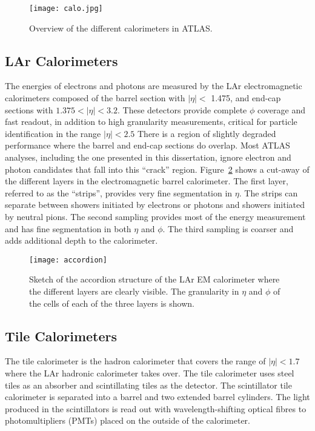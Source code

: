 \begin{figure}[htb!]
\centering
\texttt{[image: calo.jpg]}
\caption{Overview of the different calorimeters in ATLAS.}%
\label{fig:exp.atlas.calo}
\end{figure} 


\subsection*{LAr Calorimeters}

The energies of electrons and photons are measured by the LAr electromagnetic calorimeters composed of 
the barrel section with $|\eta| <$ 1.475, and end-cap sections with $1.375 < |\eta| < 3.2$.
These detectors provide complete $\phi$ coverage and fast readout, in addition to 
high granularity measurements, critical for particle identification in the range $|\eta|<2.5$
There is a region of slightly degraded performance where the barrel and end-cap sections 
do overlap. Most ATLAS analyses, including the one presented in this dissertation, ignore
electron and photon candidates that fall into this ``crack'' region.
Figure~\ref{fig:exp.atlas.accordion}
shows a cut-away of the different layers in the electromagnetic barrel calorimeter. The first layer, referred to as
the ``strips'', provides very fine segmentation in $\eta$. The strips can separate between showers initiated
by electrons or photons and showers initiated by neutral pions. The second sampling provides most
of the energy measurement and has fine segmentation in both $\eta$ and $\phi$. The third sampling is coarser
and adds additional depth to the calorimeter.



\begin{figure}[htb!]
\centering
\texttt{[image: accordion]}
\caption{Sketch of the accordion structure of the LAr EM calorimeter
where the different layers are clearly visible. 
The granularity in $\eta$ and $\phi$ of the cells of each of the three layers is shown.}%
\label{fig:exp.atlas.accordion}
\end{figure} 


\subsection*{Tile Calorimeters}

The tile calorimeter  is the hadron calorimeter that covers the range of $|\eta| < 1.7$
where the LAr hadronic calorimeter takes over.
The tile calorimeter uses steel tiles as an absorber and scintillating tiles as the detector.
The scintillator tile calorimeter is separated into a barrel and two extended barrel cylinders.
The light produced in the scintillators is read out with wavelength-shifting optical fibres to photomultipliers (PMTs) placed on the outside of the calorimeter. 


